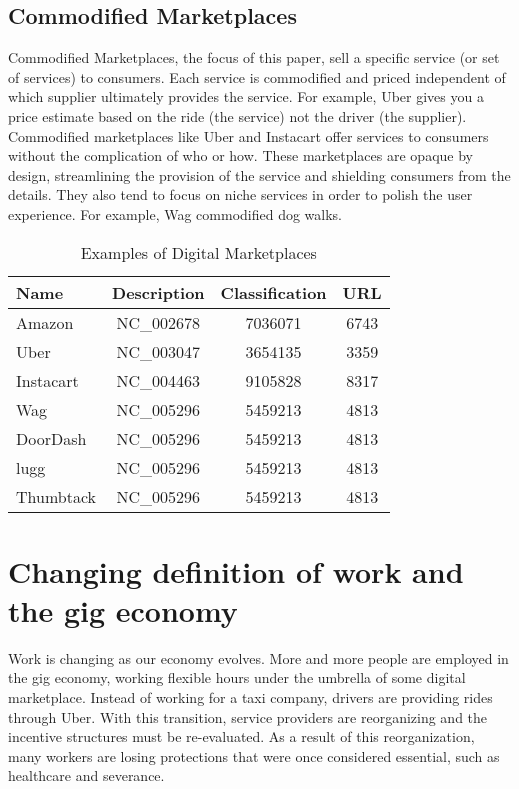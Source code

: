 \subsection{Commodified Marketplaces}
Commodified Marketplaces, the focus of this paper, sell a specific service (or set of services) to consumers. Each service is commodified and priced independent of which supplier ultimately provides the service. For example, Uber gives you a price estimate based on the ride (the service) not the driver (the supplier). Commodified marketplaces like Uber and Instacart offer services to consumers without the complication of who or how. These marketplaces are opaque by design, streamlining the provision of the service and shielding consumers from the details. They also tend to focus on niche services in order to polish the user experience. For example, Wag commodified dog walks.

\begin{table}
  \begin{center}
  \begin{tabular}{|l|c|c|c|}
  \hline
  {\sc Name}  &  {\sc Description} & {\sc Classification} & {\sc URL} \\
  \hline
  Amazon          & NC\_002678 & 7036071 & 6743 \\
  \hline
  Uber      & NC\_003047 & 3654135 & 3359 \\
  \hline
  Instacart    & NC\_004463 & 9105828 & 8317 \\
  \hline
  Wag  & NC\_005296 & 5459213 & 4813 \\
  \hline
  DoorDash  & NC\_005296 & 5459213 & 4813 \\
  \hline
  lugg  & NC\_005296 & 5459213 & 4813 \\
  \hline
  Thumbtack  & NC\_005296 & 5459213 & 4813 \\
  \hline
  \end{tabular}
  \end{center}
  \caption{Examples of Digital Marketplaces}
  \label{digital_marketplaces}
  \end{table}

\section{Changing definition of work and the gig economy}
Work is changing as our economy evolves. More and more people are employed in the gig economy, working flexible hours under the umbrella of some digital marketplace. Instead of working for a taxi company, drivers are providing rides through Uber. With this transition, service providers are reorganizing and the incentive structures must be re-evaluated. As a result of this reorganization, many workers are losing protections that were once considered essential, such as healthcare and severance.


